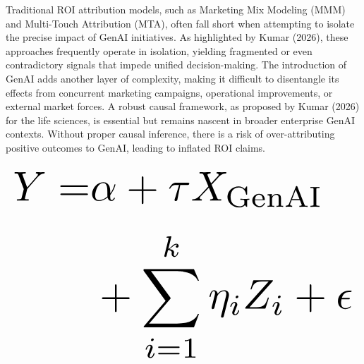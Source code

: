 \documentclass{article}
\begin{document}
Traditional ROI attribution models, such as Marketing Mix Modeling (MMM) and Multi-Touch Attribution (MTA), often fall short when attempting to isolate the precise impact of GenAI initiatives. As highlighted by Kumar (2026), these approaches frequently operate in isolation, yielding fragmented or even contradictory signals that impede unified decision-making. The introduction of GenAI adds another layer of complexity, making it difficult to disentangle its effects from concurrent marketing campaigns, operational improvements, or external market forces. A robust causal framework, as proposed by Kumar (2026) for the life sciences, is essential but remains nascent in broader enterprise GenAI contexts. Without proper causal inference, there is a risk of over-attributing positive outcomes to GenAI, leading to inflated ROI claims.












































\begin{equation}
\resizebox{\columnwidth}{!}{$\displaystyle
\begin{aligned}
Y = & \alpha + \tau X_{\text{GenAI}} \\
& + \sum_{i=1}^k \eta_i Z_i + \epsilon
\end{aligned}
$}
\end{equation}
\end{document}
